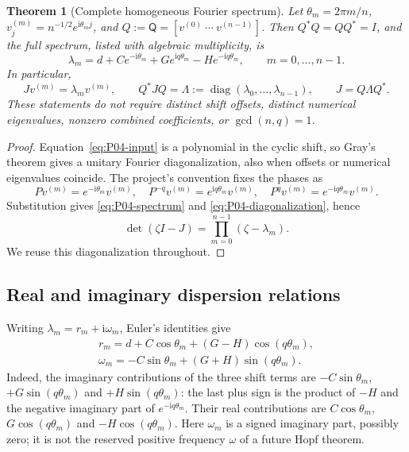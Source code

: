 \documentclass[11pt]{article}
\let\OriginalCite\cite
\renewcommand{\cite}[2][]{%
  \textcolor{CitationRed}{%
    \if\relax\detokenize{#1}\relax
      \OriginalCite{#2}%
    \else
      \OriginalCite[#1]{#2}%
    \fi}}
\newcommand{\ii}{\mathrm{i}}
\newcommand{\Fourier}{\mathsf{Q}}
\DeclareMathOperator{\diag}{diag}
\newtheorem{theorem}{Theorem}[section]
\theoremstyle{definition}
\theoremstyle{remark}
\begin{document}
\begin{theorem}[Complete homogeneous Fourier spectrum]
\label{thm:P04-spectrum}
Let $\theta_m=2\pi m/n$, $v^{(m)}_j=n^{-1/2}e^{\ii\theta_m j}$,
and $Q:=\Fourier=[v^{(0)}\ \cdots\ v^{(n-1)}]$.
Then $Q^*Q=QQ^*=I$, and the full spectrum, listed with algebraic
multiplicity, is
\begin{equation}
 \boxed{\lambda_m=d+Ce^{-\ii\theta_m}
                      +Ge^{\ii q\theta_m}-He^{-\ii q\theta_m},
           \qquad m=0,\ldots,n-1.}
 \label{eq:P04-spectrum}
\end{equation}
In particular,
\begin{equation}
 Jv^{(m)}=\lambda_m v^{(m)},\qquad
 Q^*JQ=\Lambda:=\diag(\lambda_0,\ldots,\lambda_{n-1}),\qquad
 J=Q\Lambda Q^*.
 \label{eq:P04-diagonalization}
\end{equation}
These statements do not require distinct shift offsets, distinct
numerical eigenvalues, nonzero combined coefficients, or
$\gcd(n,q)=1$.
\end{theorem}
\begin{proof}
Equation~\eqref{eq:P04-input} is a polynomial in the cyclic shift,
so Gray's theorem \cite[Theorem~3.1]{Gray2006} gives a unitary Fourier
diagonalization, also when offsets or numerical eigenvalues coincide.
The project's convention fixes the phases as
\begin{equation}
 Pv^{(m)}=e^{-\ii\theta_m}v^{(m)},\quad
 P^{-q}v^{(m)}=e^{\ii q\theta_m}v^{(m)},\quad
 P^qv^{(m)}=e^{-\ii q\theta_m}v^{(m)}.
 \label{eq:P04-shifts}
\end{equation}
Substitution gives \eqref{eq:P04-spectrum} and
\eqref{eq:P04-diagonalization}, hence
\begin{equation}
 \det(\zeta I-J)=\prod_{m=0}^{n-1}(\zeta-\lambda_m).
 \label{eq:P04-characteristic}
\end{equation}
We reuse this diagonalization throughout.
\end{proof}

\subsection{Real and imaginary dispersion relations}

Writing $\lambda_m=r_m+\ii\omega_m$, Euler's identities give
\begin{align}
 \boxed{r_m=d+C\cos\theta_m+(G-H)\cos(q\theta_m),}
   \label{eq:P04-real}\\
 \boxed{\omega_m=-C\sin\theta_m+(G+H)\sin(q\theta_m).}
   \label{eq:P04-imag}
\end{align}
Indeed, the imaginary contributions of the three shift terms are
$-C\sin\theta_m$, $+G\sin(q\theta_m)$ and
$+H\sin(q\theta_m)$: the last plus sign is the product of
$-H$ and the negative imaginary part of $e^{-\ii q\theta_m}$.
Their real contributions are $C\cos\theta_m$,
$G\cos(q\theta_m)$ and $-H\cos(q\theta_m)$.
Here $\omega_m$ is a signed imaginary part, possibly zero; it is not
the reserved positive frequency $\omega$ of a future Hopf theorem.
\end{document}
